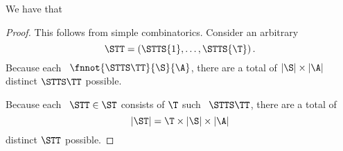 \begin{proposition}
  \nrp
  We have that %
\end{proposition}

\begin{proof}
  \nrp
  This follows from simple combinatorics.
  Consider an arbitrary \str
  $$\STT = \left(\STTS{1},\ldots,\STTS{\T}\right).$$
  Because each \stpstr\ $\fnnot{\STTS\TT}{\S}{\A}$,
  there are a total of $|\S| \times |\A|$ distinct $\STTS\TT$ possible.

  \nrp
  Because each \str\ $\STT \in \ST$ consists of $\T$ such \stpstrs\ $\STTS\TT$,
  there are a total of 
  $$|\ST| = \T \times |\S| \times |\A|$$
  distinct $\STT$ possible.
\end{proof}
